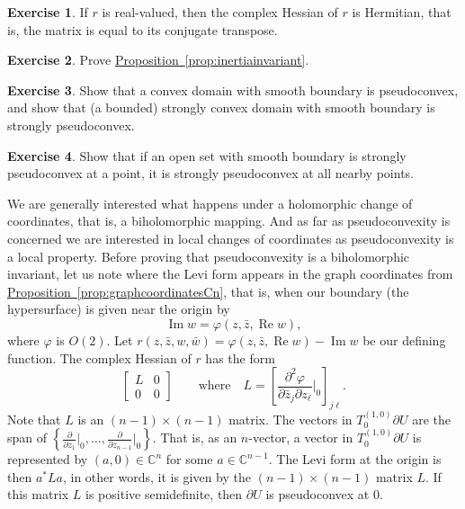\documentclass[12pt,openany]{book}
\renewcommand{\Re}{\operatorname{Re}}
\renewcommand{\Im}{\operatorname{Im}}
\newcommand{\C}{{\mathbb{C}}}
\theoremstyle{plain}
\theoremstyle{remark}
\theoremstyle{definition}
\newenvironment{exbox}{%
    \def\FrameCommand{\vrule width 1pt \relax\hspace{10pt}}%
    \MakeFramed {\advance \hsize -\width \FrameRestore}%
}{%
    \endMakeFramed
}
\theoremstyle{exercise}
\newtheorem{exercise}{Exercise}[section]
\theoremstyle{example}
\newcommand{\propref}[1]{\hyperref[#1]{Proposition~\ref*{#1}}}
\begin{document}
\begin{exbox}
\begin{exercise}
If $r$ is real-valued, then the complex Hessian of $r$ is Hermitian, that
is, the matrix is equal to its conjugate transpose.
\end{exercise}

\begin{exercise}
Prove \propref{prop:inertiainvariant}.
\end{exercise}

\begin{exercise}
Show that a convex domain with smooth boundary
is pseudoconvex, and show that (a bounded) strongly convex
domain with smooth boundary is strongly pseudoconvex.
\end{exercise}

\begin{exercise}
Show that if an open set with smooth boundary is strongly pseudoconvex at a point, it is strongly
pseudoconvex at all nearby points.
\end{exercise}
\end{exbox}

We are generally interested what happens under a holomorphic change of
coordinates, that is, a biholomorphic mapping.  And as far as pseudoconvexity
is concerned we are interested in local changes of coordinates as
pseudoconvexity is a local property.  Before proving 
that pseudoconvexity is a biholomorphic invariant, let us note where the
Levi form appears in the graph coordinates from 
\propref{prop:graphcoordinatesCn}, that is, when our boundary (the
hypersurface) is given near the origin by
\begin{equation*}
\Im w = \varphi(z,\bar{z},\Re w) ,
\end{equation*}
where $\varphi$ is $O(2)$.
Let $r(z,\bar{z},w,\bar{w}) = \varphi(z,\bar{z},\Re w) - \Im w$ be our
defining function.  The complex Hessian of $r$ has the form
\begin{equation*}
\begin{bmatrix}
L & 0 \\
0 & 0
\end{bmatrix}
\qquad \text{where} \quad
L = \left[
\frac{\partial^2 \varphi}{\partial \bar{z}_j \partial z_{\ell}}\Big|_0
\right]_{j \ell} .
\end{equation*}
Note that $L$ is an $(n-1) \times (n-1)$ matrix.
The vectors in $T_0^{(1,0)} \partial U$ are the span
of $\left\{
\frac{\partial}{\partial z_1}\big|_0,
\ldots,
\frac{\partial}{\partial z_{n-1}}\big|_0 \right\}$.
That is, as an $n$-vector,
a vector in $T_0^{(1,0)} \partial U$ is represented by $(a,0) \in \C^n$ for
some
$a \in \C^{n-1}$.  The Levi form at the origin is then $a^* L a$,
in other words, it is given by the $(n-1) \times (n-1)$ matrix $L$.
If this matrix $L$ is positive
semidefinite, then $\partial U$ is pseudoconvex at $0$.
\end{document}

